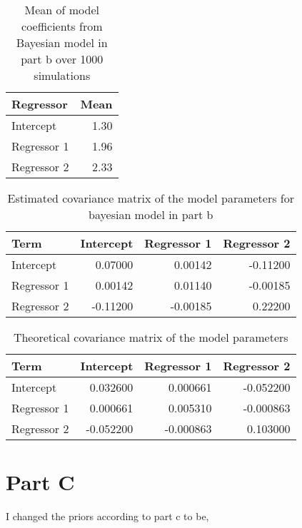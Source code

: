 \documentclass[]{book}
\begin{document}
\begin{table}

\caption{\label{tab:bayes-b-mean-coefs-q3}Mean of model coefficients from Bayesian model in part b over 1000 simulations}
\centering
\begin{tabular}[t]{lr}
\toprule
Regressor & Mean\\
\midrule
Intercept & 1.30\\
Regressor 1 & 1.96\\
Regressor 2 & 2.33\\
\bottomrule
\end{tabular}
\end{table}

\begin{table}

\caption{\label{tab:bayes-b-est-vcov-q3}Estimated covariance matrix of the model parameters for bayesian model in part b}
\centering
\begin{tabular}[t]{lrrr}
\toprule
Term & Intercept & Regressor 1 & Regressor 2\\
\midrule
Intercept & 0.07000 & 0.00142 & -0.11200\\
Regressor 1 & 0.00142 & 0.01140 & -0.00185\\
Regressor 2 & -0.11200 & -0.00185 & 0.22200\\
\bottomrule
\end{tabular}
\end{table}

\begin{table}

\caption{\label{tab:theory-vcov-b-q3}Theoretical covariance matrix of the model parameters}
\centering
\begin{tabular}[t]{lrrr}
\toprule
Term & Intercept & Regressor 1 & Regressor 2\\
\midrule
Intercept & 0.032600 & 0.000661 & -0.052200\\
Regressor 1 & 0.000661 & 0.005310 & -0.000863\\
Regressor 2 & -0.052200 & -0.000863 & 0.103000\\
\bottomrule
\end{tabular}
\end{table}

\hypertarget{part-c-2}{%
\section{Part C}\label{part-c-2}}

I changed the priors according to part c to be,
\end{document}
